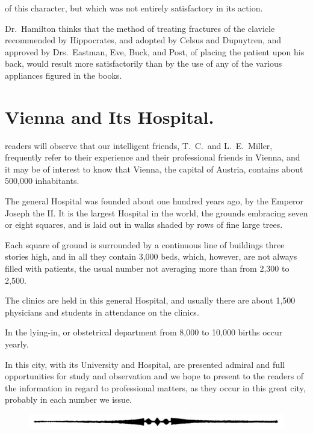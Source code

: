 of this character, but which was not entirely satisfactory in its
action.

Dr.\ Hamilton thinks that the method of treating fractures of the clavicle
recommended by Hippocrates, and adopted by Celsus and Dupuytren,
and approved by Drs.~Eastman, Eve, Buck, and Post, of placing the
patient upon his back, would result more satisfactorily than by the use
of any of the various appliances figured in the books.

\smallornament
\section*{Vienna and Its Hospital.}

 readers will observe that our intelligent friends,  T.~C.\ and
L.~E.\ Miller, frequently refer to their experience and their professional
friends in Vienna, and it may be of interest to know that Vienna, the
capital of Austria, contains about 500,000 inhabitants.

The general Hospital was founded about one hundred years ago, by
the Emperor Joseph the II. It is the largest Hospital in the world,
the grounds embracing seven or eight squares, and is laid out in walks
shaded by rows of fine large trees.

Each square of ground is surrounded by a continuous line of buildings
three stories high, and in all they contain 3,000 beds, which, however,
are not always filled with patients, the usual number not averaging
more than from 2,300 to 2,500.

The clinics are held in this general Hospital, and usually there are
about 1,500 physicians and students in attendance on the clinics.

In the lying-in, or obstetrical department from 8,000 to 10,000 births
occur yearly.

In this city, with its University and Hospital, are presented admiral
and full opportunities for study and observation and we hope to present
to the readers of the  information in regard to
professional matters, as they occur in this great city, probably in each
number we issue.

\begin{figure}[H]
  \centering
  \includegraphics{pages/illustrations/bullet_arrow_divider.jpg}
\end{figure}

